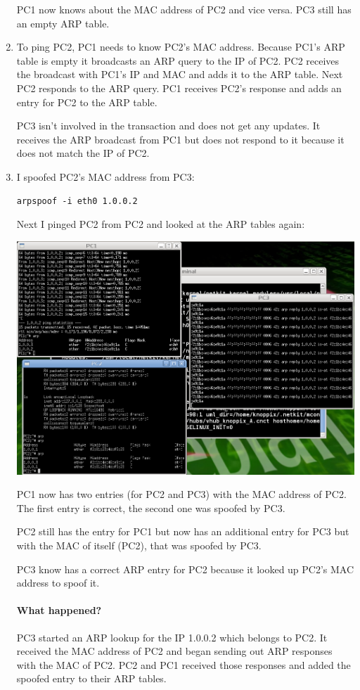 \documentclass[12pt, a4paper]{article}
\begin{document}
\begin{enumerate}[a]
	PC1 now knows about the MAC address of PC2 and vice versa. PC3 still has an empty ARP table.

	\item %
	To ping PC2, PC1 needs to know PC2's MAC address. Because PC1's ARP table is empty it broadcasts an ARP query to the IP of PC2. PC2 receives the broadcast with PC1's IP and MAC and adds it to the ARP table. Next PC2 responds to the ARP query. PC1 receives PC2's response and adds an entry for PC2 to the ARP table.

	PC3 isn't involved in the transaction and does not get any updates. It receives the ARP broadcast from PC1 but does not respond to it because it does not match the IP of PC2.

	\item %
	I spoofed PC2's MAC address from PC3:
	\begin{lstlisting}
arpspoof -i eth0 1.0.0.2
	\end{lstlisting}

	Next I pinged PC2 from PC2 and looked at the ARP tables again:

	\includegraphics[width=\linewidth]{screenshots/screen3}

	PC1 now has two entries (for PC2 and PC3) with the MAC address of PC2. The first entry is correct, the second one was spoofed by PC3.

	PC2 still has the entry for PC1 but now has an additional entry for PC3 but with the MAC of itself (PC2), that was spoofed by PC3.

	PC3 know has a correct ARP entry for PC2 because it looked up PC2's MAC address to spoof it.

	\paragraph{What happened?}
	PC3 started an ARP lookup for the IP 1.0.0.2 which belongs to PC2. It received the MAC address of PC2 and began sending out ARP responses with the MAC of PC2. PC2 and PC1 received those responses and added the spoofed entry to their ARP tables.
\end{enumerate}
\end{document}
